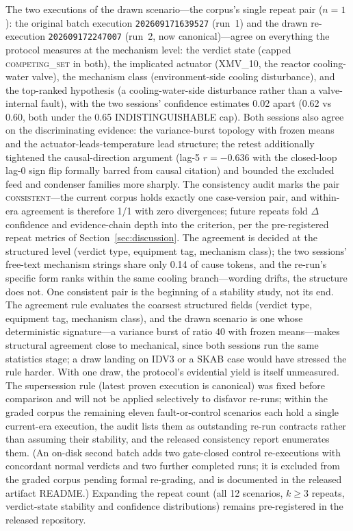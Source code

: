 \documentclass[preprint,10pt]{elsarticle}
\begin{document}
The two executions of the drawn scenario---the corpus's single repeat pair ($n{=}1$): the original batch execution \texttt{202609171639527} (run~1) and the drawn re-execution \texttt{202609172247007} (run~2, now canonical)---agree on everything the protocol measures at the mechanism level: the verdict state (capped \mbox{\textsc{competing\_set}} in both), the implicated actuator (XMV\_10, the reactor cooling-water valve), the mechanism class (environment-side cooling disturbance), and the top-ranked hypothesis (a cooling-water-side disturbance rather than a valve-internal fault), with the two sessions' confidence estimates 0.02 apart (0.62 vs 0.60, both under the 0.65 INDISTINGUISHABLE cap). Both sessions also agree on the discriminating evidence: the variance-burst topology with frozen means and the actuator-leads-temperature lead structure; the retest additionally tightened the causal-direction argument (lag-5 $r{=}{-}0.636$ with the closed-loop lag-0 sign flip formally barred from causal citation) and bounded the excluded feed and condenser families more sharply. The consistency audit marks the pair \textsc{consistent}---the current corpus holds exactly one case-version pair, and within-era agreement is therefore 1/1 with zero divergences; future repeats fold $\Delta$confidence and evidence-chain depth into the criterion, per the pre-registered repeat metrics of Section~\ref{sec:discussion}. The agreement is decided at the structured level (verdict type, equipment tag, mechanism class); the two sessions' free-text mechanism strings share only 0.14 of cause tokens, and the re-run's specific form ranks within the same cooling branch---wording drifts, the structure does not. One consistent pair is the beginning of a stability study, not its end. The agreement rule evaluates the coarsest structured fields (verdict type, equipment tag, mechanism class), and the drawn scenario is one whose deterministic signature---a variance burst of ratio 40 with frozen means---makes structural agreement close to mechanical, since both sessions run the same statistics stage; a draw landing on IDV3 or a SKAB case would have stressed the rule harder. With one draw, the protocol's evidential yield is itself unmeasured. The supersession rule (latest proven execution is canonical) was fixed before comparison and will not be applied selectively to disfavor re-runs; within the graded corpus the remaining eleven fault-or-control scenarios each hold a single current-era execution, the audit lists them as outstanding re-run contracts rather than assuming their stability, and the released consistency report enumerates them. (An on-disk second batch adds two gate-closed control re-executions with concordant normal verdicts and two further completed runs; it is excluded from the graded corpus pending formal re-grading, and is documented in the released artifact README.) Expanding the repeat count (all 12 scenarios, $k \ge 3$ repeats, verdict-state stability and confidence distributions) remains pre-registered in the released repository.
\end{document}
